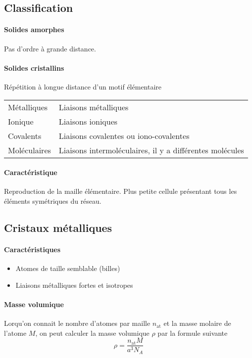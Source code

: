 \documentclass[11pt,a4paper,french]{article}
\begin{document}
\subsection{Classification}

\paragraph{Solides amorphes}
Pas d'ordre à grande distance.

\paragraph{Solides cristallins}
Répétition à longue distance d'un motif élémentaire
\begin{center}
	\begin{tabular}{ll}
		Métalliques & Liaisons métalliques\\
		Ionique & Liaisons ioniques\\
		Covalents & Liaisons covalentes ou iono-covalentes\\
		Moléculaires & Liaisons intermoléculaires, il y a différentes molécules
	\end{tabular}
\end{center}

\paragraph{Caractéristique}
Reproduction de la maille élémentaire.
Plus petite cellule présentant tous les éléments symétriques du réseau.

\subsection{Cristaux métalliques}

\paragraph{Caractéristiques}
\begin{itemize}
	\item Atomes de taille semblable (billes)
	\item Liaisons métalliques fortes et isotropes
\end{itemize}

\paragraph{Masse volumique}
Lorqu'on connait le nombre d'atomes par maille $n_{\mathrm{at}}$ et la masse molaire de l'atome $M$,
on peut calculer la masse volumique $\rho$ par la formule suivante
\[ \rho = \frac{n_{\mathrm{at}}M}{a^3N_A} \]
\end{document}
